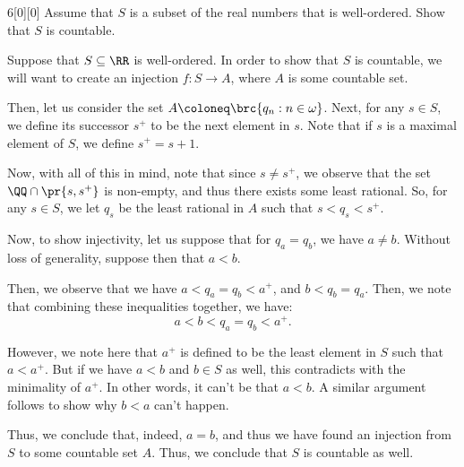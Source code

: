 \documentclass{article}
\begin{document}
\begin{hw}{6}[0][0]
	Assume that $S$ is a subset of the real numbers that is well-ordered. Show that $S$ is countable.
\end{hw}
\begin{solution}
	Suppose that $S \subseteq \RR$ is well-ordered. In order to show that $S$ is countable, we will want to create an injection $f : S \rightarrow A$, where $A$ is some countable set.
	
	Then, let us consider the set $A \coloneq \brc{q_n : n \in \omega}$. Next, for any $s \in S$, we define its successor $s^{+}$ to be the next element in $s$. Note that if $s$ is a maximal element of $S$, we define $s^{+} = s + 1$.
	
	Now, with all of this in mind, note that since $s \neq s^{+}$, we observe that the set $\QQ \cap \pr{s, s^{+}}$ is non-empty, and thus there exists some least rational. So, for any $s \in S$, we let $q_s$ be the least rational in $A$ such that $s < q_s < s^{+}$. 
	
	Now, to show injectivity, let us suppose that for $q_a = q_b$, we have $a \neq b$. Without loss of generality, suppose then that $a < b$.
	
	Then, we observe that we have $a < q_a = q_b < a^{+}$, and $b < q_b = q_a$. Then, we note that combining these inequalities together, we have:
	\begin{equation*}
		a < b < q_a = q_b < a^{+}.
	\end{equation*}

	However, we note here that $a^{+}$ is defined to be the least element in $S$ such that $a < a^{+}$. But if we have $a < b$ and $b \in S$ as well, this contradicts with the minimality of $a^{+}$. In other words, it can't be that $a < b$. A similar argument follows to show why $b < a$ can't happen.
	
	Thus, we conclude that, indeed, $a = b$, and thus we have found an injection from $S$ to some countable set $A$. Thus, we conclude that $S$ is countable as well.
\end{solution}
\end{document}
